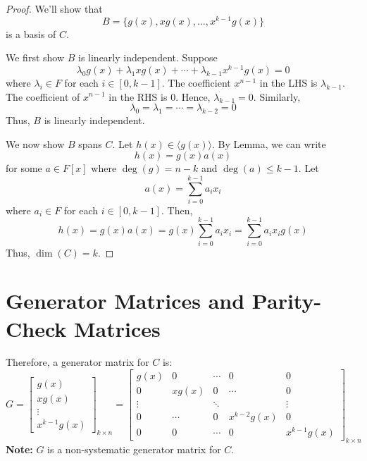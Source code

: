 \begin{proof}
    We'll show that
    \[ B=\{g(x),xg(x),\ldots ,x^{k-1}g(x)\} \]
    is a basis of $ C $.

    We first show $ B $ is linearly independent. Suppose
    \[ \lambda_0g(x)+\lambda_1xg(x)+\cdots+\lambda_{k-1}x^{k-1}g(x)=0 \]
    where $ \lambda_i\in F $ for each $ i\in[0,k-1] $.
    The coefficient $ x^{n-1} $ in the LHS
    is $ \lambda_{k-1} $. The coefficient of $ x^{n-1} $ in the RHS is $ 0 $.
    Hence, $ \lambda_{k-1}=0 $. Similarly,
    \[ \lambda_0=\lambda_1=\cdots=\lambda_{k-2}=0 \]
    Thus, $ B $ is linearly independent.

    We now show $ B $ spans $ C $. Let $ h(x)\in \langle g(x)\rangle $.
    By Lemma, we can write
    \[ h(x)=g(x)a(x) \]
    for some $ a\in F[x] $ where $ \deg(g)=n-k $ and $ \deg(a)\leqslant k-1 $. Let
    \[ a(x)=\sum\limits_{i=0}^{k-1} a_i x_i \]
    where $ a_i\in F $ for each $ i\in[0,k-1] $. Then,
    \[ h(x)=g(x)a(x)=g(x)\sum\limits_{i=0}^{k-1} a_i x_i=
        \sum\limits_{i=0}^{k-1} a_i x_i g(x) \]
    Thus, $ \dim(C)=k $.
\end{proof}

\section{Generator Matrices and Parity-Check Matrices}

Therefore, a generator matrix for $ C $ is:
\[ G
    =
    \begin{bmatrix}
        g(x)   \\
        xg(x)  \\
        \vdots \\
        x^{k-1}g(x)
    \end{bmatrix}_{k\times n}
    =
    \begin{bmatrix}
        g(x)   & 0      & \cdots & 0           & 0           \\
        0      & xg(x)  & 0      & \cdots      & 0           \\
        \vdots &        & \ddots &             & \vdots      \\
        0      & \cdots & 0      & x^{k-2}g(x) & 0           \\
        0      & 0      & \cdots & 0           & x^{k-1}g(x)
    \end{bmatrix}_{k\times n}
\]
\textbf{Note:} $ G $ is a non-systematic generator matrix for $ C $.

